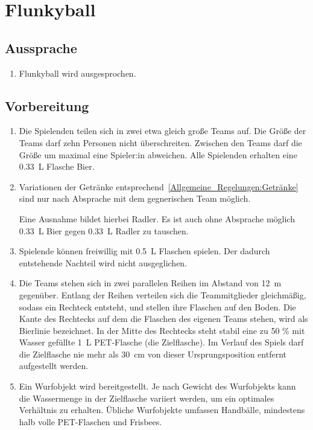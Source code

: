 \chapter{Flunkyball}
\section{Aussprache}
\begin{enumerate}[label={(\arabic*)}]
    \item
    Flunkyball wird  ausgesprochen.
\end{enumerate}

\section{Vorbereitung}
\begin{enumerate}[label={(\arabic*)}]
    \item
    Die Spielenden teilen sich in zwei etwa gleich große Teams auf.
    Die Größe der Teams darf zehn Personen nicht überschreiten.
    Zwischen den Teams darf die Größe um maximal eine Spieler:in abweichen.
    Alle Spielenden erhalten eine \SI{0,33}{\liter} Flasche Bier.

    \item Variationen der Getränke entsprechend~\ref{Allgemeine_Regelungen:Getränke} sind nur nach Absprache mit dem gegnerischen Team möglich.

    Eine Ausnahme bildet hierbei Radler.
    Es ist auch ohne Absprache möglich \SI{0,33}{\liter} Bier gegen \SI{0,33}{\liter} Radler zu tauschen.

    \item
    Spielende können freiwillig mit \SI{0,5}{\liter} Flaschen spielen.
    Der dadurch entstehende Nachteil wird nicht ausgeglichen.

    \item\label{Flunkyball:Vorbereitung:Spielfeld}
    Die Teams stehen sich in zwei parallelen Reihen im Abstand von \SI{12}{\meter} gegenüber.
    Entlang der Reihen verteilen sich die Teammitglieder gleichmäßig, sodass ein Rechteck entsteht, und stellen ihre Flaschen auf den Boden.
    Die Kante des Rechtecks auf dem die Flaschen des eigenen Teams stehen, wird als \glqq{}Bierlinie\grqq{} bezeichnet.
    In der Mitte des Rechtecks steht stabil eine zu 50 \% mit Wasser gefüllte \SI{1}{\liter} PET-Flasche (die \glqq{}Zielflasche\grqq{}).
    Im Verlauf des Spiels darf die Zielflasche nie mehr als \SI{30}{\centi\meter} von dieser Ursprungsposition entfernt aufgestellt werden.

    \item
    Ein Wurfobjekt wird bereitgestellt.
    Je nach Gewicht des Wurfobjekts kann die Wassermenge in der Zielflasche variiert werden, um ein optimales Verhältnis zu erhalten.
    Übliche Wurfobjekte umfassen Handbälle, mindestens halb volle PET-Flaschen und Frisbees.
\end{enumerate}

